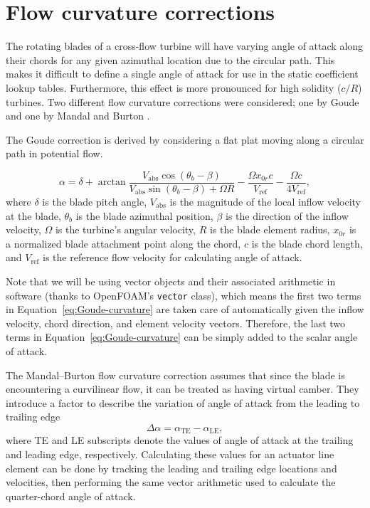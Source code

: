 \section{Flow curvature corrections}

The rotating blades of a cross-flow turbine will have varying angle of attack
along their chords for any given azimuthal location due to the circular path.
This makes it difficult to define a single angle of attack for use in the static
coefficient lookup tables. Furthermore, this effect is more pronounced for high
solidity ($c/R$) turbines. Two different flow curvature corrections were
considered; one by Goude \cite{Goude2012} and one by Mandal and Burton
\cite{Mandal1994}.

The Goude correction is derived by considering a flat plat moving along a
circular path in potential flow.

\begin{equation}
    \alpha = \delta + \arctan \frac{V_\mathrm{abs} \cos(\theta_b -
        \beta)}{V_\mathrm{abs} \sin(\theta_b - \beta) + \Omega R} - \frac{\Omega
        x_{0r}c}{V_\mathrm{ref}} - \frac{\Omega c}{4 V_\mathrm{ref}},
    \label{eq:Goude-curvature}
\end{equation}
where $\delta$ is the blade pitch angle, $V_\mathrm{abs}$ is the magnitude of
the local inflow velocity at the blade, $\theta_b$ is the blade azimuthal
position, $\beta$ is the direction of the inflow velocity, $\Omega$ is the
turbine's angular velocity, $R$ is the blade element radius, $x_{0r}$ is a
normalized blade attachment point along the chord, $c$ is the blade chord
length, and $V_\mathrm{ref}$ is the reference flow velocity for calculating
angle of attack.

Note that we will be using vector objects and their associated arithmetic in
software (thanks to OpenFOAM's \texttt{vector} class), which means the first two
terms in Equation~\ref{eq:Goude-curvature} are taken care of automatically given
the inflow velocity, chord direction, and element velocity vectors. Therefore,
the last two terms in Equation~\ref{eq:Goude-curvature} can be simply added to
the scalar angle of attack.

The Mandal--Burton flow curvature correction assumes that since the blade is
encountering a curvilinear flow, it can be treated as having virtual camber.
They introduce a factor to describe the variation of angle of attack from the
leading to trailing edge
\begin{equation}
    \Delta \alpha = \alpha_\mathrm{TE} - \alpha_\mathrm{LE},
    \label{eq:Mandal-Burton-alpha-diff}
\end{equation}
where TE and LE subscripts denote the values of angle of attack at the trailing
and leading edge, respectively. Calculating these values for an actuator line
element can be done by tracking the leading and trailing edge locations and
velocities, then performing the same vector arithmetic used to calculate the
quarter-chord angle of attack.

